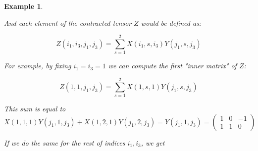 \documentclass[11pt,a4paper,openright,oneside]{book}
\numberwithin{equation}{section}
\newtheorem{example0}[defn0]{Example}
\newenvironment{example}{ \begin{example0}\rm}{\end{example0}}
\begin{document}
\begin{example}
\begin{center}
\begin{minipage}{0.2\textwidth}
\end{minipage}
\hfill
\begin{minipage}{0.225\textwidth}
\end{minipage}
\hfill
\begin{minipage}{0.225\textwidth}
\end{minipage}

    \end{center}

And each element of the contracted tensor $Z$ would be defined as:

$$Z(i_1, i_3, j_1, j_3) = \sum_{s=1}^2 X(i_1, s, i_3) Y(j_1, s, j_3)$$

For example, by fixing $i_1 = i_3 = 1$ we can compute
the first "inner matrix" of $Z$:

$$Z(1, 1, j_1, j_3) = \sum_{s=1}^2 X(1, s, 1) Y(j_1, s, j_3)$$

This sum is equal to
$$X(1, 1, 1) Y(j_1, 1, j_3) + X(1, 2, 1) Y(j_1, 2, j_3) = Y(j_1, 1, j_3) = 
\begin{pmatrix}
    1 & 0 & -1 \\
    1 & 1 & 0
\end{pmatrix}
$$

If we do the same for the rest of indices $i_1, i_3$, we get


\end{example}
\end{document}
